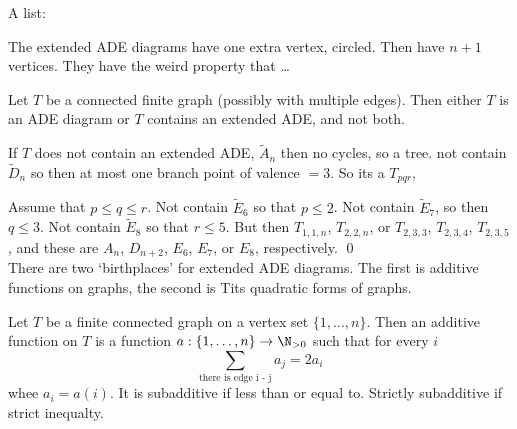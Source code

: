A list:








The extended ADE diagrams have one extra vertex, circled. Then have $n+1$ vertices. They have the weird property that \dots

\begin{lem} \label{lem:a}
Let $T$ be a connected finite graph (possibly with multiple edges). Then either $T$ is an ADE diagram or $T$ contains an extended ADE, and not both. 
\end{lem}

\pf If $T$ does not contain an extended ADE, $\tilde{A}_n$ then no cycles, so a tree. not contain $\tilde{D}_n$ so then at most one branch point of valence $=3$. So its a $T_{pqr}$, 


Assume that $p \leq q \leq r$. Not contain $\tilde{E}_6$ so that $p \leq 2$. Not contain $\tilde{E}_7$, so then $q \leq 3$. Not contain $\tilde{E}_8$ so that $r \leq 5$. But then $T_{1,1,n}$, $T_{2,2,n}$, or $T_{2,3,3}$, $T_{2,3,4}$, $T_{2,3,5}$, and these are $A_n$, $D_{n+2}$, $E_6$, $E_7$, or $E_8$, respectively. \qed \\


There are two `birthplaces' for extended ADE diagrams. The first is additive functions on graphs, the second is Tits quadratic forms of graphs. 


\begin{dfn}
Let $T$ be a finite connected graph on a vertex set $\{1,\ldots,n\}$. Then an additive function on $T$ is a function $a: \{1,\ldots,n\} \to \N_{>0}$ such that for every $i$
	\[
	\sum_{\text{there is edge i - j}} a_j = 2a_i
	\]
whee $a_i = a(i)$. It is subadditive if less than or equal to. Strictly subadditive if strict inequalty. 
\end{dfn}



